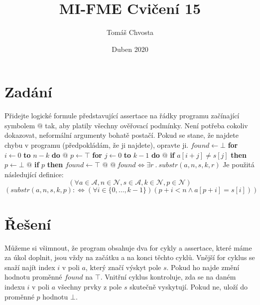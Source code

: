 \documentclass{article}
\title{MI-FME Cvičení 15}
\author{Tomáš Chvosta}
\date{Duben 2020}
\newcommand\tab[1][0.5cm]{\hspace*{#1}}
\begin{document}
\maketitle

\section{Zadání}

Přidejte logické formule představující assertace na řádky programu začínající symbolem $@$ tak, aby platily všechny ověřovací podmínky. Není potřeba cokoliv dokazovat, neformální argumenty bohatě postačí. Pokud se stane, že najdete chybu v programu (předpokládám, že ji najdete), opravte ji. \newline\newline $found \leftarrow \bot$ \newline \textbf{for} $i \leftarrow 0$ \textbf{to} $n - k$ \textbf{do} \newline \tab $@$ \newline \tab $p \leftarrow \top$ \newline \tab \textbf{for} $j \leftarrow 0$ \textbf{to} $k - 1$ \textbf{do} \newline \tab \tab $@$ \newline \tab \tab \textbf{if} $a[i+j] \neq s[j]$ \textbf{then} \newline \tab \tab \tab $p \leftarrow \bot$ \newline \tab \tab $@$ \newline \tab \textbf{if} $p$ \textbf{then} $found \leftarrow \top$ \newline \tab $@$ \newline $@\ found  \Leftrightarrow \exists r\ .\ substr(a, n, s, k, r)$ \newline\newline Je použitá následující definice: \newline $$(\forall a \in \mathcal{A}, n \in \mathcal{N}, s \in \mathcal{A}, k \in \mathcal{N}, p \in \mathcal{N})$$ $$(substr(a,n,s,k,p): \Leftrightarrow (\forall i \in \{0,\dots,k-1\})(p + i < n \wedge a[p + i] = s[i]))$$

\section{Řešení}
Můžeme si všimnout, že program obsahuje dva for cykly a assertace, které máme za úkol doplnit, jsou vždy na začátku a na konci těchto cyklů. Vnější for cyklus se snaží najít index $i$ v poli $a$, který značí výskyt pole $s$. Pokud ho najde změní hodnotu proměnné $found$ na $\top$. Vnitřní cyklus kontroluje, zda se na daném indexu $i$ v poli $a$ všechny prvky z pole $s$ skutečně vyskytují. Pokud ne, uloží do proměnné $p$ hodnotu $\bot$.
\end{document}
